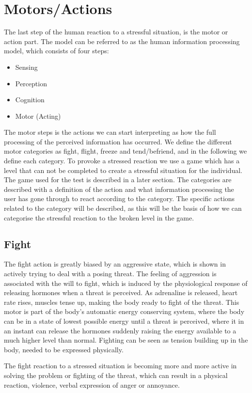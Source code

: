 \section{Motors/Actions}
The last step of the human reaction to a stressful situation, is the motor or action part. The model can be referred to as the human information processing model, which consists of four steps:
\begin{itemize}
\item Sensing
\item Perception
\item Cognition
\item Motor (Acting)
\end{itemize}
The motor steps is the actions we can start interpreting as how the full processing of the perceived information has occurred. We define the different motor categories as fight, flight, freeze and tend/befriend, and in the following we define each category. To provoke a stressed reaction we use a game which has a level that can not be completed to create a stressful situation for the individual. The game used for the test is described in a later section. The categories are described with a definition of the action and what information processing the user has gone through to react according to the category. The specific actions related to the category will be described, as this will be the basis of how we can categorise the stressful reaction to the broken level in the game. \cite{humanprocessor}

\subsection{Fight}
The fight action is greatly biased by an aggressive state, which is shown in actively trying to deal with a posing threat. The feeling of aggression is associated with the will to fight, which is induced by the physiological response of releasing hormones when a threat is perceived. As adrenaline is released, heart rate rises, muscles tense up, making the body ready to fight of the threat. This motor is part of the body's automatic energy conserving system, where the body can be in a state of lowest possible energy until a threat is perceived, where it in an instant can release the hormones suddenly raising the energy available to a much higher level than normal. Fighting can be seen as tension building up in the body, needed to be expressed physically.

The fight reaction to a stressed situation is becoming more and more active in solving the problem or fighting of the threat, which can result in a physical reaction, violence, verbal expression of anger or annoyance.


